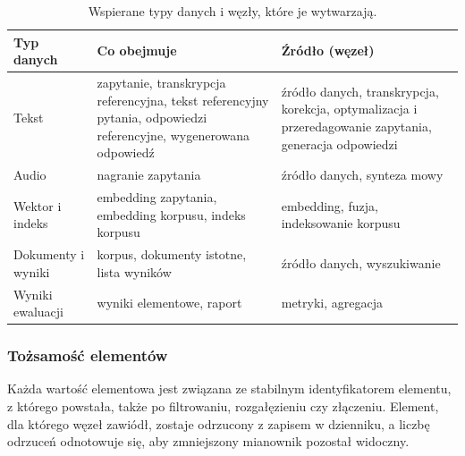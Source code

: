 \begin{table}[htbp]
\centering
\small
\begin{tabular}{@{}L{3.2cm}L{6.0cm}L{4.6cm}@{}}
\toprule
\textbf{Typ danych} & \textbf{Co obejmuje} & \textbf{Źródło (węzeł)} \\
\midrule
Tekst        & zapytanie, transkrypcja referencyjna, tekst referencyjny pytania, odpowiedzi referencyjne, wygenerowana odpowiedź & źródło danych, transkrypcja, korekcja, optymalizacja i przeredagowanie zapytania, generacja odpowiedzi \\
Audio        & nagranie zapytania                              & źródło danych, synteza mowy \\
Wektor i indeks & embedding zapytania, embedding korpusu, indeks korpusu & embedding, fuzja, indeksowanie korpusu \\
Dokumenty i wyniki & korpus, dokumenty istotne, lista wyników  & źródło danych, wyszukiwanie \\
Wyniki ewaluacji & wyniki elementowe, raport                    & metryki, agregacja \\
\bottomrule
\end{tabular}
\caption{Wspierane typy danych i węzły, które je wytwarzają.}
\label{tab:artefakty}
\end{table}

\subsubsection{Tożsamość elementów}
Każda wartość elementowa jest związana ze stabilnym identyfikatorem elementu, z którego powstała,
także po filtrowaniu, rozgałęzieniu czy złączeniu. Element, dla którego węzeł zawiódł, zostaje
odrzucony z zapisem w dzienniku, a liczbę odrzuceń odnotowuje się, aby zmniejszony mianownik
pozostał widoczny.

